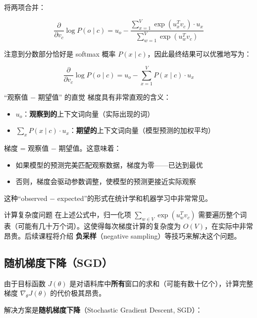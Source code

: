 \documentclass[a4paper]{article}
\begin{document}
将两项合并：

$$\frac{\partial}{\partial v_c} \log P(o \mid c) = u_o - \frac{\sum_{x=1}^{V} \exp(u_x^T v_c) \cdot u_x}{\sum_{w=1}^{V} \exp(u_w^T v_c)}$$





注意到分数部分恰好是 softmax 概率 $P(x \mid c)$，因此最终结果可以优雅地写为：

$$\boxed{\frac{\partial}{\partial v_c} \log P(o \mid c) = u_o - \sum_{x=1}^{V} P(x \mid c) \cdot u_x}$$

\begin{importantbox}{``观察值 $-$ 期望值'' 的直觉}
梯度具有非常直观的含义：
\begin{itemize}
    \item $u_o$：\textbf{观察到的}上下文词向量（实际出现的词）
    \item $\sum_{x} P(x \mid c) \cdot u_x$：\textbf{期望的}上下文词向量（模型预测的加权平均）
\end{itemize}
梯度 = 观察值 $-$ 期望值。这意味着：
\begin{itemize}
    \item 如果模型的预测完美匹配观察数据，梯度为零——已达到最优
    \item 否则，梯度会驱动参数调整，使模型的预测更接近实际观察
\end{itemize}
这种``observed $-$ expected''的形式在统计学和机器学习中非常常见。
\end{importantbox}

\begin{warningbox}{计算复杂度问题}
在上述公式中，归一化项 $\sum_{w \in V} \exp(u_w^T v_c)$ 需要遍历整个词表（可能有几十万个词）。这使得每次梯度计算的复杂度为 $O(V)$，在实际中非常昂贵。后续课程将介绍 \textbf{负采样}（negative sampling）等技巧来解决这个问题。
\end{warningbox}

\subsection{随机梯度下降（SGD）}

由于目标函数 $J(\theta)$ 是对语料库中\textbf{所有}窗口的求和（可能有数十亿个），计算完整梯度 $\nabla_\theta J(\theta)$ 的代价极其昂贵。





解决方案是\textbf{随机梯度下降}（Stochastic Gradient Descent, SGD）：
\end{document}
